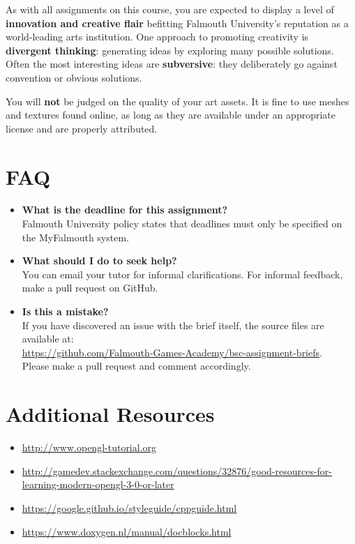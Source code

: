 \documentclass{../../fal_assignment}
\begin{document}
As with all assignments on this course, you are expected to display a level of
\textbf{innovation and creative flair} befitting Falmouth University's reputation as a world-leading
arts institution.
One approach to promoting creativity is
\textbf{divergent thinking}: generating ideas by exploring many possible solutions.
Often the most interesting ideas are \textbf{subversive}: they deliberately go against
convention or obvious solutions.

You will \textbf{not} be judged on the quality of your art assets.
It is fine to use meshes and textures found online,
as long as they are available under an appropriate license and are properly attributed.

\section*{FAQ}

\begin{itemize}
	\item 	\textbf{What is the deadline for this assignment?} \\ 
    		Falmouth University policy states that deadlines must only be specified on the MyFalmouth system.
    		
	\item 	\textbf{What should I do to seek help?} \\ 
    		You can email your tutor for informal clarifications. For informal feedback, make a pull request on GitHub. 
    		
    	\item 	\textbf{Is this a mistake?} \\ 	
    		If you have discovered an issue with the brief itself, the source files are available at: \\
    		\url{https://github.com/Falmouth-Games-Academy/bsc-assignment-briefs}.\\
    		 Please make a pull request and comment accordingly.
\end{itemize}

\section*{Additional Resources}

\begin{itemize}
    \item \url{http://www.opengl-tutorial.org}
    \item \url{http://gamedev.stackexchange.com/questions/32876/good-resources-for-learning-modern-opengl-3-0-or-later}
    \item \url{https://google.github.io/styleguide/cppguide.html}
    \item \url{https://www.doxygen.nl/manual/docblocks.html}
\end{itemize}
\end{document}

